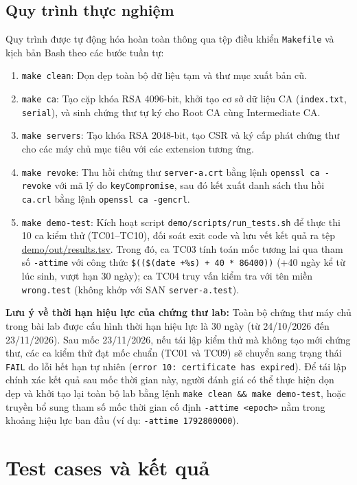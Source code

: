 \subsection{Quy trình thực nghiệm}
\label{subsec:exp-workflow}
Quy trình được tự động hóa hoàn toàn thông qua tệp điều khiển \texttt{Makefile} và kịch bản Bash theo các bước tuần tự:
\begin{enumerate}
    \item \texttt{make clean}: Dọn dẹp toàn bộ dữ liệu tạm và thư mục xuất bản cũ.
    \item \texttt{make ca}: Tạo cặp khóa RSA 4096-bit, khởi tạo cơ sở dữ liệu CA (\texttt{index.txt}, \texttt{serial}), và sinh chứng thư tự ký cho Root CA cùng Intermediate CA.
    \item \texttt{make servers}: Tạo khóa RSA 2048-bit, tạo CSR và ký cấp phát chứng thư cho các máy chủ mục tiêu với các extension tương ứng.
    \item \texttt{make revoke}: Thu hồi chứng thư \texttt{server-a.crt} bằng lệnh \texttt{openssl ca -revoke} với mã lý do \texttt{keyCompromise}, sau đó kết xuất danh sách thu hồi \texttt{ca.crl} bằng lệnh \texttt{openssl ca -gencrl}.
    \item \texttt{make demo-test}: Kích hoạt script \texttt{demo/scripts/run\_tests.sh} để thực thi 10 ca kiểm thử (TC01--TC10), đối soát exit code và lưu vết kết quả ra tệp \url{demo/out/results.tsv}. Trong đó, ca TC03 tính toán mốc tương lai qua tham số \texttt{-attime} với công thức \texttt{\$((\$(date +\%s) + 40 * 86400))} (+40 ngày kể từ lúc sinh, vượt hạn 30 ngày); ca TC04 truy vấn kiểm tra với tên miền \texttt{wrong.test} (không khớp với SAN \texttt{server-a.test}).
\end{enumerate}

\noindent\textbf{Lưu ý về thời hạn hiệu lực của chứng thư lab:} Toàn bộ chứng thư máy chủ trong bài lab được cấu hình thời hạn hiệu lực là 30 ngày (từ 24/10/2026 đến 23/11/2026). Sau mốc 23/11/2026, nếu tái lập kiểm thử mà không tạo mới chứng thư, các ca kiểm thử đạt mốc chuẩn (TC01 và TC09) sẽ chuyển sang trạng thái \texttt{FAIL} do lỗi hết hạn tự nhiên (\texttt{error 10: certificate has expired}). Để tái lập chính xác kết quả sau mốc thời gian này, người đánh giá có thể thực hiện dọn dẹp và khởi tạo lại toàn bộ lab bằng lệnh \texttt{make clean \&\& make demo-test}, hoặc truyền bổ sung tham số mốc thời gian cố định \texttt{-attime <epoch>} nằm trong khoảng hiệu lực ban đầu (ví dụ: \texttt{-attime 1792800000}).

\section{Test cases và kết quả}
\label{sec:exp-results}

